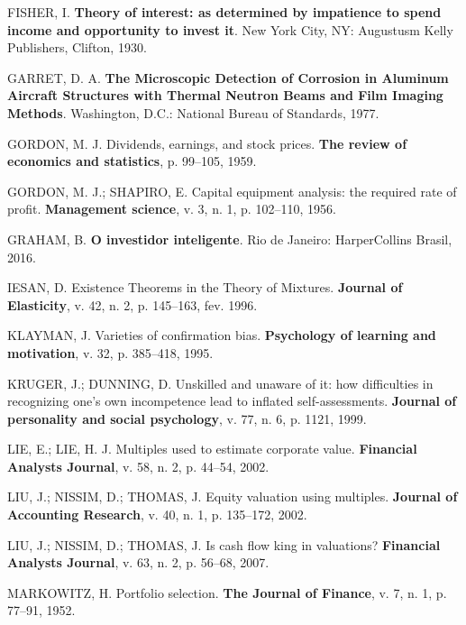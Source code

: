 \documentclass[grad,numbers]{coppe}
\newenvironment{cslreferences}%
  {}%
  {\par}
\begin{document}
\begin{cslreferences}
  \leavevmode\hypertarget{ref-fisher1930}{}%
  FISHER, I. \textbf{Theory of interest: as determined by impatience to spend income and opportunity to invest it}. New York City, NY: Augustusm Kelly Publishers, Clifton, 1930.

  \leavevmode\hypertarget{ref-techreport-exampleIn}{}%
  GARRET, D. A. \textbf{The Microscopic Detection of Corrosion in Aluminum Aircraft Structures with Thermal Neutron Beams and Film Imaging Methods}. Washington, D.C.: National Bureau of Standards, 1977.

  \leavevmode\hypertarget{ref-gordon1959}{}%
  GORDON, M. J. Dividends, earnings, and stock prices. \textbf{The review of economics and statistics}, p. 99--105, 1959.

  \leavevmode\hypertarget{ref-gordon1956}{}%
  GORDON, M. J.; SHAPIRO, E. Capital equipment analysis: the required rate of profit. \textbf{Management science}, v. 3, n. 1, p. 102--110, 1956.

  \leavevmode\hypertarget{ref-graham2016}{}%
  GRAHAM, B. \textbf{O investidor inteligente}. Rio de Janeiro: HarperCollins Brasil, 2016.

  \leavevmode\hypertarget{ref-article-example}{}%
  IESAN, D. Existence Theorems in the Theory of Mixtures. \textbf{Journal of Elasticity}, v. 42, n. 2, p. 145--163, fev. 1996.

  \leavevmode\hypertarget{ref-klayman1995}{}%
  KLAYMAN, J. Varieties of confirmation bias. \textbf{Psychology of learning and motivation}, v. 32, p. 385--418, 1995.

  \leavevmode\hypertarget{ref-kruger1999}{}%
  KRUGER, J.; DUNNING, D. Unskilled and unaware of it: how difficulties in recognizing one's own incompetence lead to inflated self-assessments. \textbf{Journal of personality and social psychology}, v. 77, n. 6, p. 1121, 1999.

  \leavevmode\hypertarget{ref-lie2002}{}%
  LIE, E.; LIE, H. J. Multiples used to estimate corporate value. \textbf{Financial Analysts Journal}, v. 58, n. 2, p. 44--54, 2002.

  \leavevmode\hypertarget{ref-liu2002}{}%
  LIU, J.; NISSIM, D.; THOMAS, J. Equity valuation using multiples. \textbf{Journal of Accounting Research}, v. 40, n. 1, p. 135--172, 2002.

  \leavevmode\hypertarget{ref-liu2007}{}%
  LIU, J.; NISSIM, D.; THOMAS, J. Is cash flow king in valuations? \textbf{Financial Analysts Journal}, v. 63, n. 2, p. 56--68, 2007.

  \leavevmode\hypertarget{ref-markowitz1952}{}%
  MARKOWITZ, H. Portfolio selection. \textbf{The Journal of Finance}, v. 7, n. 1, p. 77--91, 1952.


\end{cslreferences}
\end{document}
